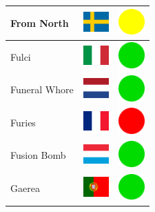 \documentclass[12pt, a4paper, twoside]{report}
\begin{document}
\begin{center}
\begin{longtable}{|p{5cm}|p{2cm}|p{2cm}|}
 From North                                                 & \includegraphics[width=1cm]{../4x3/se} &   \includegraphics[width=1cm]{../likes/m} \\ \hline
 Fulci                                                      & \includegraphics[width=1cm]{../4x3/it} &   \includegraphics[width=1cm]{../likes/y} \\ \hline
 Funeral Whore                                              & \includegraphics[width=1cm]{../4x3/nl} &   \includegraphics[width=1cm]{../likes/y} \\ \hline
 Furies                                                     & \includegraphics[width=1cm]{../4x3/fr} &   \includegraphics[width=1cm]{../likes/n} \\ \hline
 Fusion Bomb                                                & \includegraphics[width=1cm]{../4x3/lu} &   \includegraphics[width=1cm]{../likes/y} \\ \hline
 Gaerea                                                     & \includegraphics[width=1cm]{../4x3/pt} &   \includegraphics[width=1cm]{../likes/y} \\ \hline

\end{longtable}
\end{center}
\end{document}
